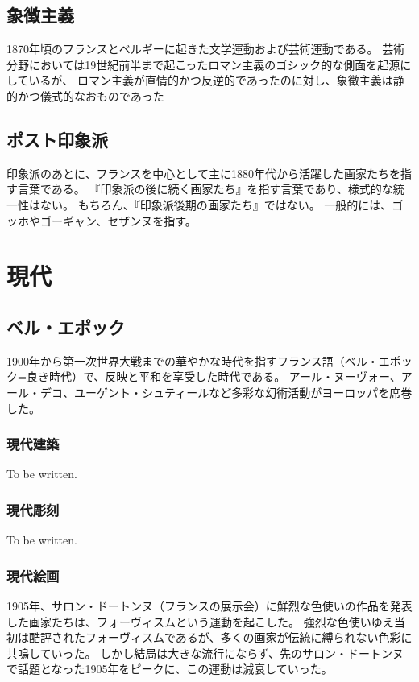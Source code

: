 \documentclass[letterpaper,10pt,dvipdfmx]{sphinxmanual}
\begin{document}
\subsection{象徴主義}
\label{\detokenize{category:id27}}
1870年頃のフランスとベルギーに起きた文学運動および芸術運動である。
芸術分野においては19世紀前半まで起こったロマン主義のゴシック的な側面を起源にしているが、
ロマン主義が直情的かつ反逆的であったのに対し、象徴主義は静的かつ儀式的なおものであった


\subsection{ポスト印象派}
\label{\detokenize{category:id28}}
印象派のあとに、フランスを中心として主に1880年代から活躍した画家たちを指す言葉である。
『印象派の後に続く画家たち』を指す言葉であり、様式的な統一性はない。
もちろん、『印象派後期の画家たち』ではない。
一般的には、ゴッホやゴーギャン、セザンヌを指す。


\section{現代}
\label{\detokenize{category:id29}}

\subsection{ベル・エポック}
\label{\detokenize{category:id30}}
1900年から第一次世界大戦までの華やかな時代を指すフランス語（ベル・エポック=良き時代）で、反映と平和を享受した時代である。
アール・ヌーヴォー、アール・デコ、ユーゲント・シュティールなど多彩な幻術活動がヨーロッパを席巻した。


\subsubsection{現代建築}
\label{\detokenize{category:id31}}
To be written.


\subsubsection{現代彫刻}
\label{\detokenize{category:id32}}
To be written.


\subsubsection{現代絵画}
\label{\detokenize{category:id33}}
1905年、サロン・ドートンヌ（フランスの展示会）に鮮烈な色使いの作品を発表した画家たちは、フォーヴィスムという運動を起こした。
強烈な色使いゆえ当初は酷評されたフォーヴィスムであるが、多くの画家が伝統に縛られない色彩に共鳴していった。
しかし結局は大きな流行にならず、先のサロン・ドートンヌで話題となった1905年をピークに、この運動は減衰していった。
\end{document}
